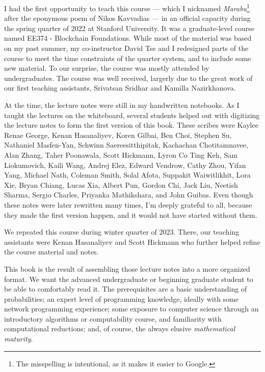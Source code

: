 % 
I had the first opportunity to teach this course --- which I nicknamed
\emph{Marabu}\footnote{The misspelling is intentional, as it makes it easier to Google.}
after the eponymous poem of Nikos Kavvadias --- in an official capacity during the
spring quarter of 2022 at Stanford University. It was a graduate-level course
named EE374 - Blockchain Foundations. While most of the material was
based on my past summer, my co-instructor David Tse and I redesigned
parts of the course to meet the time constraints of the quarter system,
and to include some new material. To our surprise, the course was mostly
attended by undergraduates.
The course was well received,
largerly due to the great work of our first teaching assistants,
Srivatsan Sridhar and Kamilla Nazirkhanova.

At the time, the lecture notes were still
in my handwritten notebooks. As I taught the lectures on the whiteboard,
several students helped out with digitizing the lecture notes to
form the first version of this book. These scribes were
Kaylee Renae George, Kenan Hasanaliyev, Koren Gilbai,
Ben Choi, Stephen Su, Nathaniel Masfen-Yan,
Schwinn Saereesitthipitak, Kachachan Chotitamnavee, Alan Zhang,
Taher Poonawala, Scott Hickmann,
Lyron Co Ting Keh, Sam Liokumovich,
Kaili Wang, Andrej Elez,
Edward Vendrow, Cathy Zhou,
Yifan Yang,
Michael Nath, Coleman Smith,
Solal Afota,
Suppakit Waiwitlikhit, Lora Xie,
Bryan Chiang, Lucas Xia,
Albert Pun, Gordon Chi,
Jack Liu,
Neetish Sharma, Sergio Charles,
Priyanka Mathikshara, and John Guibas.
Even though these notes were later rewritten many times,
I'm deeply grateful to all, because they made the first version happen,
and it would not have started without them.

We repeated this course during winter quarter of 2023.
There, our teaching assistants were Kenan Hasanaliyev
and Scott Hickmann who further helped refine the course material and notes.

This book is the result of assembling those lecture notes into a
more organized format. We want the advanced undergraduate or beginning
graduate student to be able to comfortably read it. The prerequisites
are a basic understanding of probabilities; an expert level of programming
knowledge, ideally with some network programming experience; some exposure
to computer science through an introductory algorithms or computability
course, and familiarity with computational reductions;
and, of course, the always elusive \emph{mathematical maturity}.

